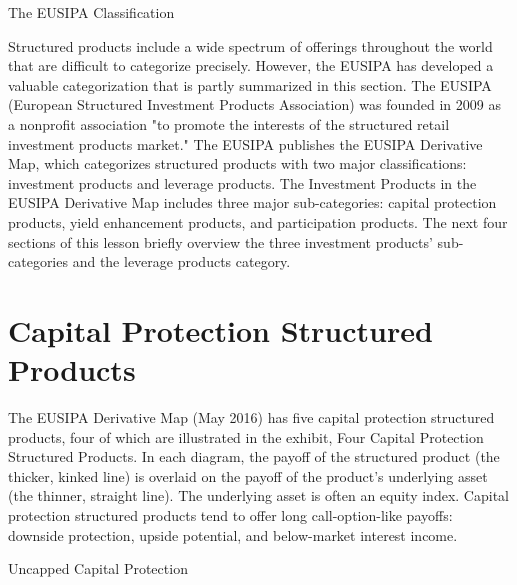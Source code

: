 \documentclass[11pt]{article}
\begin{document}
The EUSIPA Classification

Structured products include a wide spectrum of offerings throughout the world that are difficult to categorize precisely. However, the EUSIPA has developed a valuable categorization that is partly summarized in this section. The EUSIPA (European Structured Investment Products Association) was founded in 2009 as a nonprofit association "to promote the interests of the structured retail investment products market." The EUSIPA publishes the EUSIPA Derivative Map, which categorizes structured products with two major classifications: investment products and leverage products. The Investment Products in the EUSIPA Derivative Map includes three major sub-categories: capital protection products, yield enhancement products, and participation products. The next four sections of this lesson briefly overview the three investment products' sub-categories and the leverage products category.

\section*{Capital Protection Structured Products}
The EUSIPA Derivative Map (May 2016) has five capital protection structured products, four of which are illustrated in the exhibit, Four Capital Protection Structured Products. In each diagram, the payoff of the structured product (the thicker, kinked line) is overlaid on the payoff of the product's underlying asset (the thinner, straight line). The underlying asset is often an equity index. Capital protection structured products tend to offer long call-option-like payoffs: downside protection, upside potential, and below-market interest income.

Uncapped Capital Protection
\end{document}
